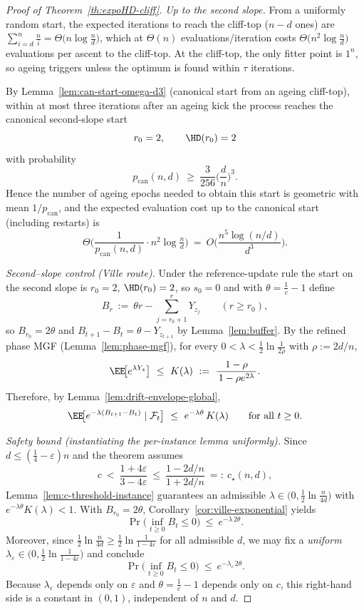 \begin{proof}[Proof of Theorem~\ref{th:expoHD-cliff}]
	\emph{Up to the second slope.}
	From a uniformly random start, the expected iterations to reach the cliff-top ($n-d$ ones) are
	$\sum_{i=d}^{n}\frac{n}{i}=\Theta\!\big(n\log\tfrac{n}{d}\big)$, which at $\Theta(n)$ evaluations/iteration costs
	$\Theta\!\big(n^{2}\log\tfrac{n}{d}\big)$ evaluations per ascent to the cliff-top. At the cliff-top, the only fitter point is $1^n$, so ageing triggers unless the optimum is found within $\tau$ iterations.
	
	By Lemma~\ref{lem:can-start-omega-d3} (canonical start from an ageing cliff-top), within at most three iterations after an ageing kick the process reaches the canonical second-slope start
	\[
	r_0=2,\qquad \HD(r_0)=2
	\]
	with probability
	\[
	p_{\mathrm{can}}(n,d)\ \ge\ \frac{3}{256}\Big(\frac{d}{n}\Big)^{\!3}.
	\]
	Hence the number of ageing epochs needed to obtain this start is geometric with mean $1/p_{\mathrm{can}}$, and the expected evaluation cost up to the canonical start (including restarts) is
	\[
	\Theta\!\Big(\frac{1}{p_{\mathrm{can}}(n,d)}\cdot n^{2}\log\tfrac{n}{d}\Big)
	\ =\ O\!\Big(\frac{n^{5}\log(n/d)}{d^{3}}\Big).
	\]
	
	\smallskip
	\emph{Second–slope control (Ville route).}
	Under the reference-update rule the start on the second slope is $r_0=2$, $\HD(r_0)=2$, so $s_0=0$ and with $\theta=\tfrac1c-1$ define
	\[
	B_r\ :=\ \theta r - \sum_{j=r_0+1}^{r} Y_{z_j}\qquad(r\ge r_0),
	\]
	so $B_{r_0}=2\theta$ and $B_{t+1}-B_t=\theta-Y_{z_{t+1}}$ by Lemma~\ref{lem:buffer}.
	By the refined phase MGF (Lemma~\ref{lem:phase-mgf}), for every $0<\lambda<\tfrac12\ln\!\tfrac{1}{2\rho}$ with $\rho:=2d/n$,
	\[
	\EE\!\big[e^{\lambda Y_z}\big]\ \le\ K(\lambda)\ :=\ \frac{1-\rho}{\,1-\rho e^{2\lambda}\,}.
	\]
	Therefore, by Lemma~\ref{lem:drift-envelope-global},
	\[
	\EE\!\big[e^{-\lambda(B_{t+1}-B_t)}\mid\mathcal F_t\big]\ \le\ e^{-\lambda\theta}\,K(\lambda)\qquad\text{for all }t\ge 0.
	\]
	
	\emph{Safety bound (instantiating the per-instance lemma uniformly).}
	Since $d\le(\tfrac14-\varepsilon)n$ and the theorem assumes
	\[
	c\ <\ \frac{1+4\varepsilon}{3-4\varepsilon}\ \le\ \frac{1-2d/n}{1+2d/n}\ =:\ c_\star(n,d),
	\]
	Lemma~\ref{lem:c-threshold-instance} guarantees an admissible $\lambda\in\big(0,\tfrac12\ln\tfrac{n}{4d}\big)$ with $e^{-\lambda\theta}K(\lambda)<1$.
	With $B_{r_0}=2\theta$, Corollary~\ref{cor:ville-exponential} yields
	\[
	\Pr\!\Big(\inf_{t\ge 0} B_t\le 0\Big)\ \le\ e^{-\lambda\,2\theta}.
	\]
	Moreover, since $\tfrac12\ln\!\tfrac{n}{4d}\ge \tfrac12\ln\!\tfrac{1}{1-4\varepsilon}$ for all admissible $d$, we may fix a \emph{uniform} $\lambda_\varepsilon\in\big(0,\tfrac12\ln\tfrac{1}{1-4\varepsilon}\big)$ and conclude
	\[
	\Pr\!\Big(\inf_{t\ge 0} B_t\le 0\Big)\ \le\ e^{-\lambda_\varepsilon\,2\theta}.
	\]
	Because $\lambda_\varepsilon$ depends only on $\varepsilon$ and $\theta=\tfrac1c-1$ depends only on $c$, this right-hand side is a constant in $(0,1)$, independent of $n$ and $d$.
	

\end{proof}
